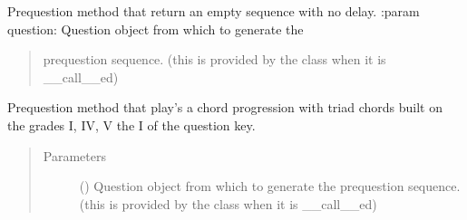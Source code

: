 \documentclass[letterpaper,10pt,english]{sphinxmanual}
\begin{document}

\begin{fulllineitems}
\label{\detokenize{index:birdears.prequestion.none}}
\sphinxAtStartPar
Pre\sphinxhyphen{}question method that return an empty sequence with no delay.
:param question: Question object from which to generate the
\begin{quote}

\sphinxAtStartPar
pre\sphinxhyphen{}question sequence. (this is provided by the  class
when it is {\color{red}\bfseries{}\textasciigrave{}}\_\_call\_\_\textasciigrave{}ed)
\end{quote}
\begin{quote}\begin{description}
\end{description}\end{quote}

\end{fulllineitems}


\begin{fulllineitems}
\label{\detokenize{index:birdears.prequestion.progression_i_iv_v_i}}
\sphinxAtStartPar
Pre\sphinxhyphen{}question method that play’s a chord progression with triad chords
built on the grades I, IV, V the I of the question key.
\begin{quote}\begin{description}
\item[{Parameters}] \leavevmode
\sphinxAtStartPar
{} () \textendash{} Question object from which to generate the
pre\sphinxhyphen{}question sequence. (this is provided by the  class
when it is {\color{red}\bfseries{}\textasciigrave{}}\_\_call\_\_\textasciigrave{}ed)

\end{description}\end{quote}

\end{fulllineitems}
\end{document}
